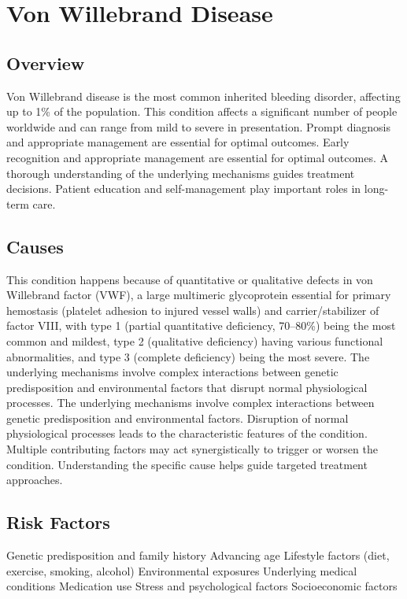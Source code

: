 \chapter{Von Willebrand Disease}
\label{sec:Von Willebrand Disease}

\section{Overview}
Von Willebrand disease is the most common inherited bleeding disorder, affecting up to 1\% of the population. This condition affects a significant number of people worldwide and can range from mild to severe in presentation. Prompt diagnosis and appropriate management are essential for optimal outcomes. Early recognition and appropriate management are essential for optimal outcomes. A thorough understanding of the underlying mechanisms guides treatment decisions. Patient education and self-management play important roles in long-term care.
\section{Causes}
This condition happens because of quantitative or qualitative defects in von Willebrand factor (VWF), a large multimeric glycoprotein essential for primary hemostasis (platelet adhesion to injured vessel walls) and carrier/stabilizer of factor VIII, with type 1 (partial quantitative deficiency, 70--80\%) being the most common and mildest, type 2 (qualitative deficiency) having various functional abnormalities, and type 3 (complete deficiency) being the most severe. The underlying mechanisms involve complex interactions between genetic predisposition and environmental factors that disrupt normal physiological processes. The underlying mechanisms involve complex interactions between genetic predisposition and environmental factors. Disruption of normal physiological processes leads to the characteristic features of the condition. Multiple contributing factors may act synergistically to trigger or worsen the condition. Understanding the specific cause helps guide targeted treatment approaches.
\section{Risk Factors}
Genetic predisposition and family history Advancing age Lifestyle factors (diet, exercise, smoking, alcohol) Environmental exposures Underlying medical conditions Medication use Stress and psychological factors Socioeconomic factors

